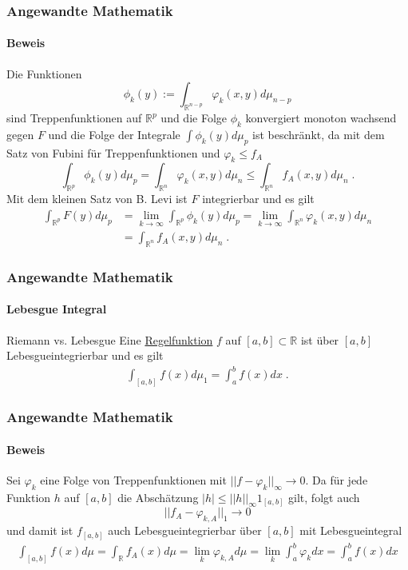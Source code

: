 \documentclass{beamer}
\begin{document}
\begin{frame}
    \frametitle{Angewandte Mathematik}
\framesubtitle{Beweis}
Die Funktionen 
$$\phi_k (y) := \int_{\mathbb{R}^{n-p}} \varphi_k (x,y) d \mu_{n-p}$$
sind Treppenfunktionen auf $\mathbb{R}^{p}$ und die Folge $\phi_k$ konvergiert monoton wachsend gegen $F$ und die Folge der Integrale 
$\int \phi_k(y) d \mu_{p}$ ist beschränkt, da  mit dem Satz von Fubini für Treppenfunktionen und $\varphi_k \leq f_A$  
$$ \int_{\mathbb{R}^{p}} \phi_k(y) d \mu_{p} = \int_{\mathbb{R}^n} \varphi_k(x,y) d\mu_{n} \leq \int_{\mathbb{R}^n} f_A(x,y) d \mu_{n} \; .$$
Mit dem kleinen Satz von B. Levi ist $F$ integrierbar und es gilt
\begin{align*}
 \int_{\mathbb{R}^{p}}   F(y) d \mu_{p} & = \lim_{k \to \infty}  \int_{\mathbb{R}^{p}}  \phi_k (y) d \mu_{p} =  \lim_{k \to \infty}  \int_{\mathbb{R}^{n}}  \varphi_k(x,y) d \mu_{n} \\
& =   \int_{\mathbb{R}^{n}}  f_A (x,y) d \mu_{n}  \; .
\end{align*} 

 \end{frame}




\begin{frame}
    \frametitle{Angewandte Mathematik}
\framesubtitle{Lebesgue Integral}
\begin{block}{Riemann vs. Lebesgue}
Eine \href{https://de.wikipedia.org/wiki/Regelfunktion}{Regelfunktion} $f$ auf $[a,b] \subset \mathbb{R}$ ist über $[a,b] $ Lebesgueintegrierbar und es gilt 
\begin{align*}
\int_{[a,b]} f(x) d \mu_1 = \int_a^b f(x) dx \; .
\end{align*}
\end{block}
 \end{frame}






\begin{frame}
    \frametitle{Angewandte Mathematik}
\framesubtitle{Beweis}
Sei $\varphi_k$ eine Folge von Treppenfunktionen mit $|| f -\varphi_k ||_{\infty} \to 0$. Da für jede Funktion $h$ auf $[a,b]$ die Abschätzung
$|h| \leq || h ||_{\infty} 1_{[a,b]}$ gilt, folgt auch $$|| f_A -\varphi_{k,A} ||_{1} \to 0$$ und damit ist $f_{[a,b]}$ auch Lebesgueintegrierbar über $[a,b]$ mit Lebesgueintegral
\begin{align*}
\int_{[a,b]} f(x) d \mu= \int_{\mathbb{R}} f_A(x) d\mu = \lim_k \varphi_{k,A} d \mu = \lim_k \int_a^b \varphi_k dx = \int_a^b f (x) dx
\end{align*}
 

 \end{frame}
\end{document}
